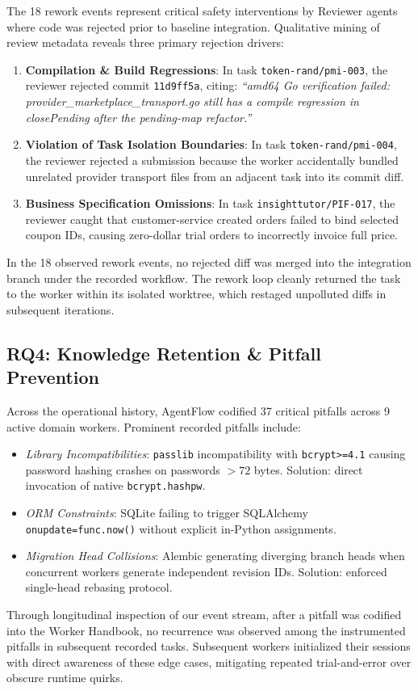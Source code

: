 \documentclass[conference]{IEEEtran}
\begin{document}
The 18 rework events represent critical safety interventions by Reviewer agents where code was rejected prior to baseline integration. Qualitative mining of review metadata reveals three primary rejection drivers:
\begin{enumerate}
    \item \textbf{Compilation \& Build Regressions}: In task \texttt{token-rand/pmi-003}, the reviewer rejected commit \texttt{11d9ff5a}, citing: \textit{``amd64 Go verification failed: provider\_marketplace\_transport.go still has a compile regression in closePending after the pending-map refactor.''}
    \item \textbf{Violation of Task Isolation Boundaries}: In task \texttt{token-rand/pmi-004}, the reviewer rejected a submission because the worker accidentally bundled unrelated provider transport files from an adjacent task into its commit diff.
    \item \textbf{Business Specification Omissions}: In task \texttt{insighttutor/PIF-017}, the reviewer caught that customer-service created orders failed to bind selected coupon IDs, causing zero-dollar trial orders to incorrectly invoice full price.
\end{enumerate}
In the 18 observed rework events, no rejected diff was merged into the integration branch under the recorded workflow. The rework loop cleanly returned the task to the worker within its isolated worktree, which restaged unpolluted diffs in subsequent iterations.

\subsection{RQ4: Knowledge Retention \& Pitfall Prevention}
Across the operational history, AgentFlow codified 37 critical pitfalls across 9 active domain workers. Prominent recorded pitfalls include:
\begin{itemize}
    \item \textit{Library Incompatibilities}: \texttt{passlib} incompatibility with \texttt{bcrypt>=4.1} causing password hashing crashes on passwords $>72$ bytes. Solution: direct invocation of native \texttt{bcrypt.hashpw}.
    \item \textit{ORM Constraints}: SQLite failing to trigger SQLAlchemy \texttt{onupdate=func.now()} without explicit in-Python assignments.
    \item \textit{Migration Head Collisions}: Alembic generating diverging branch heads when concurrent workers generate independent revision IDs. Solution: enforced single-head rebasing protocol.
\end{itemize}
Through longitudinal inspection of our event stream, after a pitfall was codified into the Worker Handbook, no recurrence was observed among the instrumented pitfalls in subsequent recorded tasks. Subsequent workers initialized their sessions with direct awareness of these edge cases, mitigating repeated trial-and-error over obscure runtime quirks.
\end{document}

